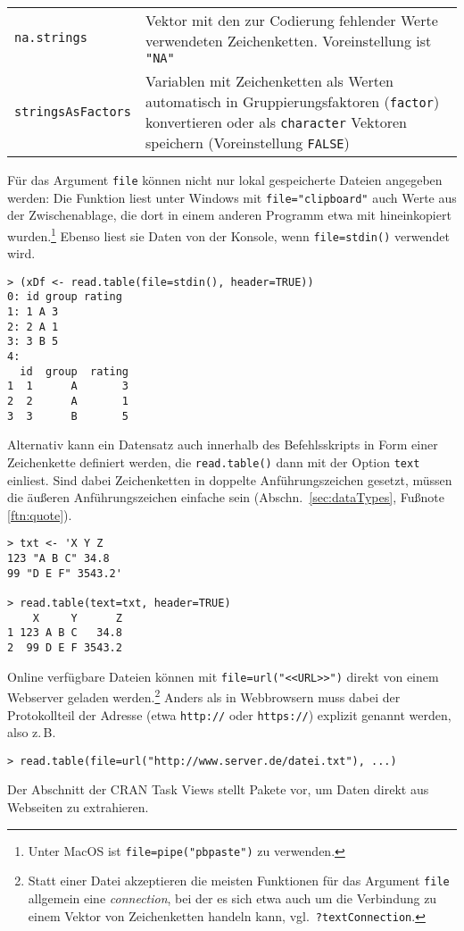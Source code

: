 \begin{longtable}{p{3.2cm}p{9.3cm}}
\lstinline!na.strings! & Vektor mit den zur Codierung fehlender Werte verwendeten Zeichenketten. Voreinstellung ist \lstinline!"NA"!\\
\lstinline!stringsAsFactors!\index{Zeichenketten!Umwandlung in Faktor} & Variablen mit Zeichenketten als Werten automatisch in Gruppierungsfaktoren (\lstinline!factor!) konvertieren oder als \lstinline!character! Vektoren speichern (Voreinstellung \lstinline!FALSE!)\\\hline
\end{longtable}

Für das Argument \lstinline!file! können nicht nur lokal gespeicherte Dateien angegeben werden: Die Funktion liest unter Windows mit \lstinline!file="clipboard"! auch Werte aus der Zwischenablage, die dort in einem anderen Programm etwa mit  hineinkopiert wurden.\footnote{\label{ftn:pbpaste}Unter MacOS ist \lstinline!file=pipe("pbpaste")! zu verwenden.} Ebenso liest sie Daten von der Konsole, wenn \lstinline!file=stdin()! verwendet wird.
\begin{lstlisting}
> (xDf <- read.table(file=stdin(), header=TRUE))
0: id group rating
1: 1 A 3
2: 2 A 1
3: 3 B 5
4:
  id  group  rating
1  1      A       3
2  2      A       1
3  3      B       5
\end{lstlisting}

Alternativ kann ein Datensatz auch innerhalb des Befehlsskripts in Form einer Zeichenkette definiert werden, die \lstinline!read.table()! dann mit der Option \lstinline!text! einliest. Sind dabei Zeichenketten in doppelte Anführungszeichen gesetzt, müssen die äußeren Anführungszeichen einfache sein (Abschn.\ \ref{sec:dataTypes}, Fußnote \ref{ftn:quote}).
\begin{lstlisting}
> txt <- 'X Y Z
123 "A B C" 34.8
99 "D E F" 3543.2'

> read.table(text=txt, header=TRUE)
    X     Y      Z
1 123 A B C   34.8
2  99 D E F 3543.2
\end{lstlisting}

Online verfügbare Dateien können mit \lstinline!file=url("<<URL>>")! direkt von einem Webserver geladen werden.\footnote{Statt einer Datei akzeptieren die meisten Funktionen für das Argument \lstinline!file! allgemein eine \emph{connection}, bei der es sich etwa auch um die Verbindung zu einem Vektor von Zeichenketten handeln kann, vgl.\ \lstinline!?textConnection!.} Anders als in Webbrowsern muss dabei der Protokollteil der Adresse (etwa \lstinline!http://! oder \lstinline!https://!) explizit genannt werden, also z.\,B.\
\begin{lstlisting}
> read.table(file=url("http://www.server.de/datei.txt"), ...)
\end{lstlisting}
Der Abschnitt  der CRAN Task Views \cite{CRANtvWebTech} stellt Pakete vor, um Daten direkt aus Webseiten zu extrahieren.

